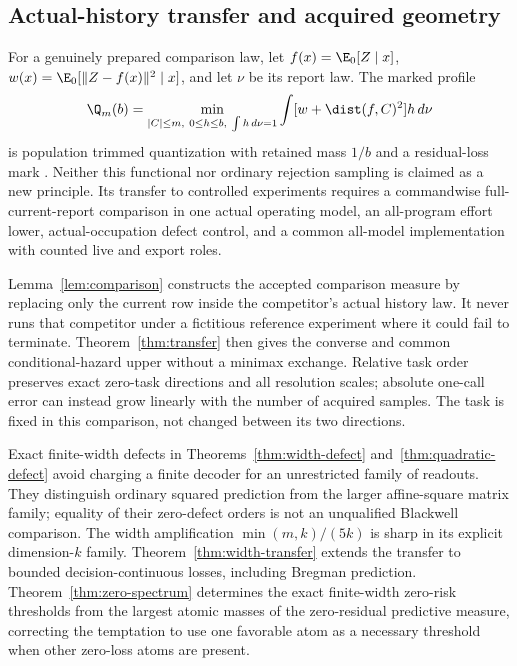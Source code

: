 \subsection*{Actual-history transfer and acquired geometry}
For a genuinely prepared comparison law, let $f(x)=\E_0[Z\mid x]$, $w(x)=\E_0[\|Z-f(x)\|^2\mid x]$, and let $\nu$ be its report law. The marked profile
\[
 \Q_m(b)=\min_{|C|\le m,\ 0\le h\le b,\ \int h\,d\nu=1}
            \int[w+\dist(f,C)^2]h\,d\nu
\]
is population trimmed quantization with retained mass $1/b$ and a residual-loss mark \cite{CGM97,GG99}. Neither this functional nor ordinary rejection sampling is claimed as a new principle. Its transfer to controlled experiments requires a commandwise full-current-report comparison in one actual operating model, an all-program effort lower, actual-occupation defect control, and a common all-model implementation with counted live and export roles.

Lemma~\ref{lem:comparison} constructs the accepted comparison measure by replacing only the current row inside the competitor's actual history law. It never runs that competitor under a fictitious reference experiment where it could fail to terminate. Theorem~\ref{thm:transfer} then gives the converse and common conditional-hazard upper without a minimax exchange. Relative task order preserves exact zero-task directions and all resolution scales; absolute one-call error can instead grow linearly with the number of acquired samples. The task is fixed in this comparison, not changed between its two directions.

Exact finite-width defects in Theorems~\ref{thm:width-defect} and~\ref{thm:quadratic-defect} avoid charging a finite decoder for an unrestricted family of readouts. They distinguish ordinary squared prediction from the larger affine-square matrix family; equality of their zero-defect orders is not an unqualified Blackwell comparison. The width amplification $\min(m,k)/(5k)$ is sharp in its explicit dimension-$k$ family. Theorem~\ref{thm:width-transfer} extends the transfer to bounded decision-continuous losses, including Bregman prediction. Theorem~\ref{thm:zero-spectrum} determines the exact finite-width zero-risk thresholds from the largest atomic masses of the zero-residual predictive measure, correcting the temptation to use one favorable atom as a necessary threshold when other zero-loss atoms are present.

